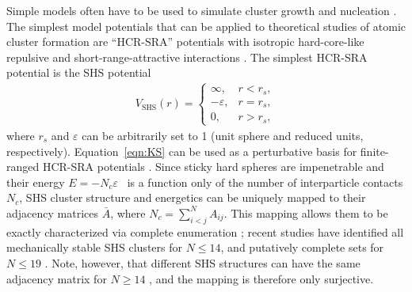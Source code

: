 Simple models often have to be used to simulate cluster growth and nucleation
\autocite{Johnston-1999, Shibuta_Homogeneousnucleationmicrostructure_2015,
Leitold-2016, Sweatman-2016}.  The simplest model potentials that can be
applied to theoretical studies of atomic cluster formation are ``HCR-SRA''
potentials with isotropic hard-core-like repulsive and short-range-attractive
interactions \autocite{baxter68}.  The simplest HCR-SRA potential is the
\ac{SHS} potential \autocite{Yuste_Stickyhardspheres_1993}
\begin{align}
    V_\mathrm{SHS}(r)=\begin{cases}
        \infty, & r < r_s,\\
        -\varepsilon, & r = r_s,\\
        0, & r > r_s,
    \end{cases}
\label{eqn:KS}
\end{align}
where $r_s$ and $\varepsilon$ can be arbitrarily set to 1 (unit sphere and
reduced units, respectively). Equation~\eqref{eqn:KS} can be used as a perturbative
basis for finite-ranged HCR-SRA potentials \autocite{cochran06,
Holmes-Cerfon_geometricalapproachcomputing_2013}.  Since sticky hard spheres
are impenetrable and their energy $E = -N_c\varepsilon$ ~is a function only of
the number of interparticle contacts $N_c$, \ac{SHS} cluster structure and
energetics can be uniquely mapped to their adjacency matrices $\bar{A}$, where
$N_c=\sum_{i<j}^N A_{ij}$.  This mapping allows them to be exactly
characterized via complete enumeration
\autocite{Arkus_Minimalenergyclusters_2009, Arkus_DerivingFiniteSphere_2011,
Hoy_Structurefinitesphere_2012}; recent studies have identified all
mechanically stable \ac{SHS} clusters for $N \leq 14$, and putatively complete sets
for $N \leq 19$ \autocite{Arkus_Minimalenergyclusters_2009,
Arkus_DerivingFiniteSphere_2011, Hoy_Structurefinitesphere_2012,
Hoy_Structuredynamicsmodel_2015, Holmes-Cerfon_StickySphereClusters_2017,
Kallus_Freeenergysingular_2017}.  Note, however, that different \ac{SHS} structures
can have the same adjacency matrix for $N \geq 14$
\autocite{Holmes-Cerfon_EnumeratingRigidSphere_2016}, and the mapping is
therefore only surjective.

